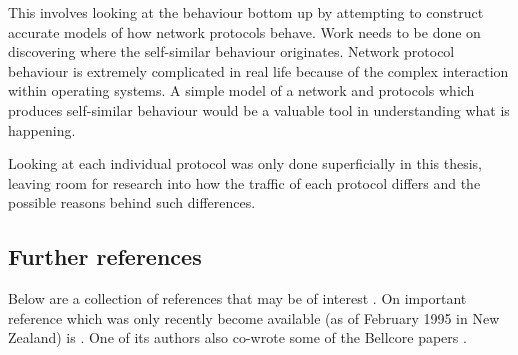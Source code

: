 This involves looking at the behaviour bottom up by attempting to
construct accurate models of how network protocols behave.  Work needs
to be done on discovering where the self-similar behaviour originates.
Network protocol behaviour is extremely complicated in real life
because of the complex interaction within operating systems.  A simple
model of a network and protocols which produces self-similar behaviour
would be a valuable tool in understanding what is happening.

Looking at each individual protocol was only done superficially in this
thesis, leaving room for research into how the traffic of each protocol
differs and the possible reasons behind such differences.

\subsection{Further references}

Below are a collection of references that may be of interest
\cite{HAP}
\cite{SDSC:report}
\cite{Lowen:Fract}
\cite{Lowen:1}
\cite{Lowen:2}.
On important reference which was only recently become available (as of
February 1995 in New Zealand) is \cite{taqqu}.  One of its authors
also co-wrote some of the Bellcore papers \cite{Bell:2} \cite{Bell:3}
\cite{Bell:4}.
